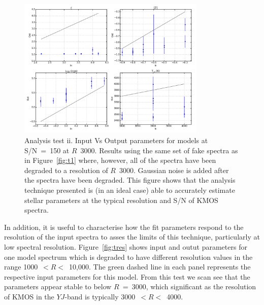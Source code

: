 \begin{figure}
 \centering
 \includegraphics[width=0.80\textwidth]{JAnal/Fakespec-t2-v1}
 \caption[Analysis test ii: Input Vs Output parameters for models at S/N~=~150 at $R$~3000]{
Analysis test ii. Input Vs Output parameters for models at S/N~=~150 at $R$~3000.
Results using the same set of fake spectra as in Figure~\ref{fig:t1} where, however, all of the spectra have been degraded to a resolution of $R$~3000.
Gaussian noise is added after the spectra have been degraded.
This figure shows that the analysis technique presented is (in an ideal case) able to accurately estimate stellar parameters at the typical resolution and S/N of KMOS spectra.
\label{fig:t2}
         }
\end{figure}

In addition, it is useful to characterise how the fit parameters respond to the resolution of the input spectra to asses the limits of this technique, particularly at low spectral resolution.
Figure~\ref{fig:tres} shows input and outut parameters for one model spectrum which is degraded to have different resolution values in the range 1000~$< R <$~10,000.
The green dashed line in each panel represents the respective input parameters for this model.
From this test we scan see that the parameters appear stable to below $R$~=~3000, which significant as the resolution of KMOS in the $YJ$-band is typically 3000~$< R <$~4000.


